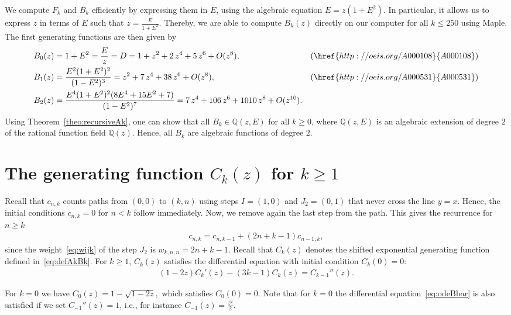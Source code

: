 \documentclass[a4paper,UKenglish,cleveref, autoref, thm-restate]{lipics-v2021}
\newcommand{\oeis}[1]{\href{http://oeis.org/#1}{#1}}
\begin{document}
We compute $F_k$ and $B_k$ efficiently by expressing them in $E$, using the algebraic equation $E = z(1+E^2)$. In particular, it allows us to express $z$ in terms of $E$ such that 
$
    z = \frac{E}{1+E^2}.
$
Thereby, we are able to compute $B_k(z)$ directly on our computer for all $k \leq 250$ using Maple. 
The first generating functions are then given by
\begin{align*}
	B_0(z) &= 1+E^2 = \frac{E}{z} = D = 1+{z}^{2}+2\,{z}^{4}+5\,{z}^{6}+O( {z}^{8}) , & (\oeis{A000108})
           \\
	B_1(z) &= \frac{E^2(1+E^2)^2}{(1-E^2)^3} = {z}^{2}+7\,{z}^{4}+38\,{z}^{6}+O( {z}^{8} ) ,& (\oeis{A000531})
                 \\
	B_2(z) &= \frac{E^4(1+E^2)^2 (8 E^4+15E^2+7)}{(1-E^2)^7} = 7\,{z}^{4}+106\,{z}^{6}+1010\,{z}^{8}+O( {z}^{10} ). &
\end{align*}
Using Theorem~\ref{theo:recursiveAk}, one can show that all $B_k \in \mathbb{Q}(z, E)$ for all $k \geq 0$, where $\mathbb{Q}(z,E)$ is an algebraic extension of degree $2$ of the rational function field $\mathbb{Q}(z)$. Hence, all $B_k$ are algebraic functions of degree $2$.

\section{The generating function \texorpdfstring{$C_k(z)$}{Ck(z)} for \texorpdfstring{$k \geq 1$}{k>=1}}

Recall that $c_{n,k}$ counts paths from $(0,0)$ to $(k,n)$ using steps $I=(1,0)$ and $J_2=(0,1)$ that never cross the line $y=x$.
Hence, the initial conditions $c_{n,k}=0$ for $n<k$ follow immediately.
Now, we remove again the last step from the path.
This gives the recurrence for $n \geq k$
\begin{align*}
    c_{n,k} = c_{n,k-1} + (2n+k-1)c_{n-1,k},
\end{align*}
since the weight~\eqref{eq:wijk} of the step $J_2$ is $w_{k,n,n}=2n+k-1$.
Recall that $C_k(z)$ denotes the shifted exponential generating function defined in~\eqref{eq:defAkBk}.
For $k\ge 1$, $C_k(z)$ satisfies the differential equation with initial condition $C_k(0)=0$:
\begin{align}   \label{eq:odeBbar}
(1-2z)C_k'(z)-(3k-1)C_k(z)=C_{k-1}''(z).
\end{align}

For $k=0$ we have
$
    C_0(z) = 1 - \sqrt{1-2z},
$
which satisfies $C_0(0)=0$.
Note that for $k=0$ the differential equation~\eqref{eq:odeBbar} is also satisfied if we set
${C}_{-1}''(z) = 1$, i.e., for instance ${C}_{-1}(z) = \frac{z^2}{2}$.
\end{document}
